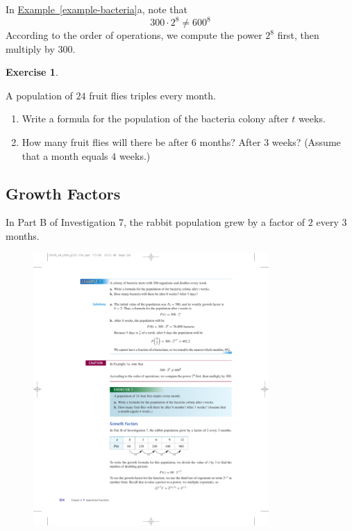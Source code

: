 \documentclass[10pt,]{book}
\theoremstyle{plain}
\theoremstyle{definition}
\theoremstyle{definition}
\theoremstyle{definition}
\theoremstyle{definition}
\theoremstyle{definition}
\newtheorem{exercise}[theorem]{Exercise}
\numberwithin{equation}{section}
\begin{document}
    In \hyperref[example-bacteria]{Example~\ref{example-bacteria}}a, note that
    \begin{equation*}300 \cdot 2^8 \ne 600^8\end{equation*}
    According to the order of operations, we compute the power \(2^8\) first, then multiply by \(300\).
%
\begin{exercise}\label{exercise-fruit-flies}

    A population of \(24\) fruit flies triples every month. 
    \leavevmode%
\begin{enumerate}[label=*\alph**]
\item\hypertarget{li-610}{}
            Write a formula for the population of the bacteria colony after \(t\) weeks.
        \item\hypertarget{li-611}{}
            How many fruit flies will there be after \(6\) months? After \(3\) weeks? (Assume that a month equals \(4\) weeks.)
        \end{enumerate}

%
\end{exercise}
\typeout{************************************************}
\typeout{************************************************}
\subsection[Growth Factors]{Growth Factors}\label{subsection-86}

    In Part B of Investigation 7, the rabbit population grew by a factor of \(2\) every \(3\) months.
%
\leavevmode%
\begin{figure}
\centering
\includegraphics[width=0.80\textwidth,]{images/fig-table-rabbit-population.pdf}\end{figure}
\par
\end{document}
